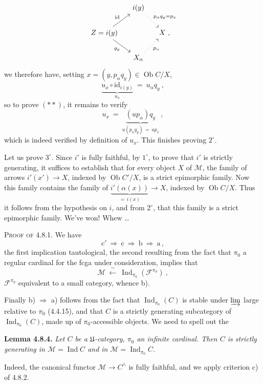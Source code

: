 \documentclass[11pt]{article}
\newcommand{\printedpage}[1]{\marginpar{\footnotesize p.~#1}}
\newcommand{\msp}[1]{\marginpar{\footnotesize [#1]}}
\newcommand{\Ob}{\operatorname{Ob}}
\newcommand{\Ind}{\operatorname{Ind}}
\begin{document}
\printedpage{69}

\[
\begin{tikzcd}[column sep=small]
 & i(y) \arrow[dr, dotted, "p_\alpha q_y=p_x"] & \\
Z=i(y) \arrow[ur, "\mathrm{id}"] \arrow[dr, "q_y"'] & & X \ , \\
 & X_\alpha \arrow[ur, dotted, "p_\alpha"'] &
\end{tikzcd}
\]
we therefore have, setting $x=(y,p_\alpha q_y)\in\Ob C/X$,
\[
\underbrace{u_x\circ\mathrm{id}_{i(y)}}_{u_x} \ = \ u_\alpha q_y \ ,
\]
so to prove $(**)$, it remains to verify
\[
u_x \ = \ \underbrace{(up_\alpha)q_y}_{u(p_\alpha q_y)\,=\,up_x} \ ,
\]
\msp{page 197}
which is indeed verified by definition of $u_x$. This finishes proving $2^\circ$.

Let us prove $3^\circ$. Since $i'$ is fully faithful, by $1^\circ$, to prove that $i'$ is strictly generating, it suffices to establish that for every object $X$ of $\mathcal{M}$, the family of arrows $i'(x')\longrightarrow X$, indexed by $\Ob C'/X$, is a strict epimorphic family. Now this family contains the family of $\underbrace{i'(\alpha(x))}_{=\,i(x)}\longrightarrow X$, indexed by $\Ob C/X$. Thus it follows from the hypothesis on $i$, and from $2^\circ$, that this family is a strict epimorphic family. We've won! Whew \dots

\textsc{Proof of 4.8.1.} We have
\[
\mathrm{c}' \ \Longrightarrow \ \mathrm{c} \ \Longrightarrow \ \mathrm{b} \ \Longrightarrow \ \mathrm{a} \, ,
\]
the first implication tautological, the second resulting from the fact that $\pi_0$ a regular cardinal for the fcga under consideration, implies that
\[
\mathcal{M} \ \xleftarrow{\ \sim\ } \ \Ind_{\pi_0}(\mathcal{F}^{\pi_0}) \ ,
\]
$\mathcal{F}^{\pi_0}$ equivalent to a small category, whence b).

\msp{page 198}
Finally b) $\Longrightarrow$ a) follows from the fact that $\Ind_{\pi_0}(C)$ is stable under $\varinjlim$ large relative to $\pi_0$ (4.4.15), and that $C$ is a strictly generating subcategory of $\Ind_{\pi_0}(C)$, made up of $\pi_0$-accessible objects. We need to spell out the

\textbf{Lemma 4.8.4.} \textit{Let $C$ be a $\mathfrak{U}$-category, $\pi_0$ an infinite cardinal. Then $C$ is strictly generating in $\mathcal{M}=\Ind C$ and in $\mathcal{M}=\Ind_{\pi_0}C$.}

\msp{page 199}
Indeed, the canonical functor $\mathcal{M}\longrightarrow C^\wedge$ is fully faithful, and we apply criterion c) of 4.8.2.
\end{document}
